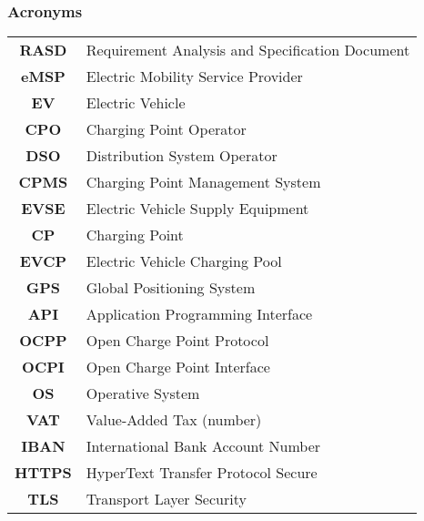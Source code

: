 \subsubsection{Acronyms}
\begin{table}[H]
    \begin{tabularx}{\textwidth}{cX}
        \toprule
        \textbf{RASD}  & Requirement Analysis and Specification Document \\
        \textbf{eMSP}  & Electric Mobility Service Provider              \\
        \textbf{EV}    & Electric Vehicle                                \\
        \textbf{CPO}   & Charging Point Operator                         \\
        \textbf{DSO}   & Distribution System Operator                    \\
        \textbf{CPMS}  & Charging Point Management System                \\
        \textbf{EVSE}  & Electric Vehicle Supply Equipment               \\
        \textbf{CP}    & Charging Point                                  \\
        \textbf{EVCP}  & Electric Vehicle Charging Pool                  \\
        \textbf{GPS}   & Global Positioning System                       \\
        \textbf{API}   & Application Programming Interface               \\
        \textbf{OCPP}  & Open Charge Point Protocol                      \\
        \textbf{OCPI}  & Open Charge Point Interface                     \\
        \textbf{OS}    & Operative System                                \\
        \textbf{VAT}   & Value-Added Tax (number)                        \\
        \textbf{IBAN}  & International Bank Account Number               \\
        \textbf{HTTPS} & HyperText Transfer Protocol Secure              \\
        \textbf{TLS}   & Transport Layer Security                        \\
        \bottomrule
    \end{tabularx}
\end{table}
\vspace*{1cm}
